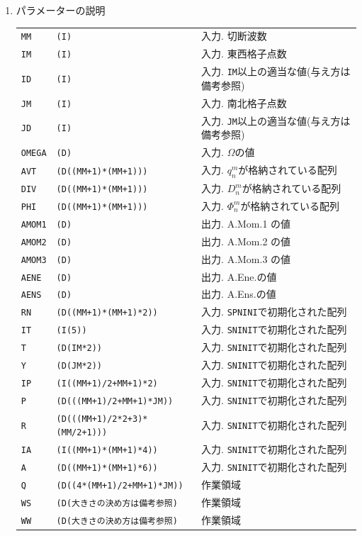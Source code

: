 \documentclass[a4j,fleqn]{jarticle}
\begin{document}
\begin{enumerate}
\item パラメーターの説明

\begin{tabular}{lll}
{\tt MM} & {\tt (I)} & 入力. 切断波数\\
{\tt IM} & {\tt (I)} & 入力. 東西格子点数\\
{\tt ID} & {\tt (I)} & 入力. {\tt IM}以上の適当な値(与え方は備考参照)\\
{\tt JM} & {\tt (I)} & 入力. 南北格子点数\\
{\tt JD} & {\tt (I)} & 入力. {\tt JM}以上の適当な値(与え方は備考参照)\\
{\tt OMEGA} & {\tt (D)} 
& 入力. $\Omega$の値\\
{\tt AVT} & {\tt (D((MM+1)*(MM+1)))} 
& 入力. $q^m_n$が格納されている配列\\
{\tt DIV} & {\tt (D((MM+1)*(MM+1)))} 
& 入力. $D^m_n$が格納されている配列\\
{\tt PHI} & {\tt (D((MM+1)*(MM+1)))} 
& 入力. $\Phi^m_n$が格納されている配列\\
{\tt AMOM1} & {\tt (D)} 
& 出力. A.Mom.1 の値\\
{\tt AMOM2} & {\tt (D)} 
& 出力. A.Mom.2 の値\\
{\tt AMOM3} & {\tt (D)} 
& 出力. A.Mom.3 の値\\
{\tt AENE} & {\tt (D)}
& 出力. A.Ene.の値\\
{\tt AENS} & {\tt (D)} 
& 出力. A.Ens.の値\\
{\tt RN} & {\tt (D((MM+1)*(MM+1)*2))} 
& 入力. {\tt SPNINI}で初期化された配列\\
{\tt IT}  & {\tt (I(5))}    & 入力. {\tt SNINIT}で初期化された配列\\
{\tt T}   & {\tt (D(IM*2))} & 入力. {\tt SNINIT}で初期化された配列\\
{\tt Y}   & {\tt (D(JM*2))} & 入力. {\tt SNINIT}で初期化された配列\\
{\tt IP}  & {\tt (I((MM+1)/2+MM+1)*2)} 
             & 入力. {\tt SNINIT}で初期化された配列\\
{\tt P}  & {\tt (D(((MM+1)/2+MM+1)*JM))} 
             & 入力. {\tt SNINIT}で初期化された配列\\
{\tt R}  & {\tt (D(((MM+1)/2*2+3)*(MM/2+1)))}
             & 入力. {\tt SNINIT}で初期化された配列\\
{\tt IA}  & {\tt (I((MM+1)*(MM+1)*4))} 
             & 入力. {\tt SNINIT}で初期化された配列\\
{\tt A}  & {\tt (D((MM+1)*(MM+1)*6))}
             & 入力. {\tt SNINIT}で初期化された配列\\
{\tt Q}  & {\tt (D((4*(MM+1)/2+MM+1)*JM))} 
             & 作業領域\\
{\tt WS}  & {\tt (D(大きさの決め方は備考参照)} & 作業領域\\
{\tt WW}  & {\tt (D(大きさの決め方は備考参照)} & 作業領域
\end{tabular}


\end{enumerate}
\end{document}
